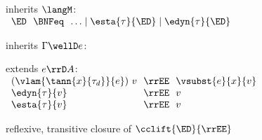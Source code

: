 \begin{flushleft}

 inherits $\langM$:\\
$\begin{array}{l@{~~}c@{~~}l}
  \ED & \BNFeq & \ldots \mid \esta{\tau}{\ED} \mid \edyn{\tau}{\ED}
\end{array}$

\medskip
{} inherits $\Gamma \wellD e$:
\begin{mathpar}


\end{mathpar}

\medskip
{} extends $e \rrD A$:\\
$\begin{array}{l@{~~}c@{~~}l}
  (\vlam{\tann{x}{\tau_d}}{e})~v & \rrEE & \vsubst{e}{x}{v}
\\
  \edyn{\tau}{v} & \rrEE & v
\\
  \esta{\tau}{v} & \rrEE & v
\end{array}$

\medskip
{} reflexive, transitive closure of $\cclift{\ED}{\rrEE}$

\end{flushleft}

